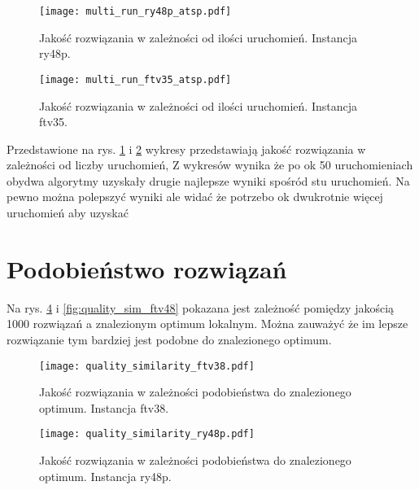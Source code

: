 \documentclass{article}
\begin{document}
\begin{figure}[H]
    \begin{center}
        \texttt{[image: multi\_run\_ry48p\_atsp.pdf]}
    \end{center}
    \caption{Jakość rozwiązania w zależności od ilości uruchomień. Instancja ry48p.}
    \label{fig:plot_multi_run_ry48p}
\end{figure}

\begin{figure}[H]
    \begin{center}
        \texttt{[image: multi\_run\_ftv35\_atsp.pdf]}
    \end{center}
    \caption{Jakość rozwiązania w zależności od ilości uruchomień. Instancja ftv35.}
    \label{fig:plot_multi_run_ftv35}
\end{figure}

Przedstawione na rys. \ref{fig:plot_multi_run_ry48p} i \ref{fig:plot_multi_run_ftv35}  wykresy przedstawiają jakość rozwiązania w zależności od liczby uruchomień, Z wykresów wynika że po ok 50 uruchomieniach obydwa algorytmy uzyskały drugie najlepsze wyniki spośród stu uruchomień. Na pewno można polepszyć wyniki ale widać że potrzebo ok dwukrotnie więcej uruchomień aby uzyskać 

\section{Podobieństwo rozwiązań}

Na rys. \ref{fig:quality_sim_ry48p} i \ref{fig:quality_sim_ftv48} pokazana jest zależność pomiędzy jakością 1000 rozwiązań a znalezionym optimum lokalnym. Można zauważyć że im lepsze rozwiązanie tym bardziej jest podobne do znalezionego optimum.

\begin{figure}[H]
    \begin{center}
        \texttt{[image: quality\_similarity\_ftv38.pdf]}
    \end{center}
    \caption{Jakość rozwiązania w zależności podobieństwa do znalezionego optimum. Instancja ftv38.}
    \label{fig:quality_sim_ftv38}
\end{figure}

\begin{figure}[H]
    \begin{center}
        \texttt{[image: quality\_similarity\_ry48p.pdf]}
    \end{center}
    \caption{Jakość rozwiązania w zależności podobieństwa do znalezionego optimum. Instancja ry48p.}
    \label{fig:quality_sim_ry48p}
\end{figure}
\end{document}
